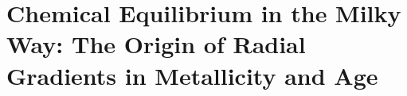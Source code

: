 \documentclass[main.tex]{subfiles}
\begin{document}
\chapter{Chemical Equilibrium in the Milky Way: The Origin of Radial Gradients
in Metallicity and Age}
\label{outflows}




\end{document}
